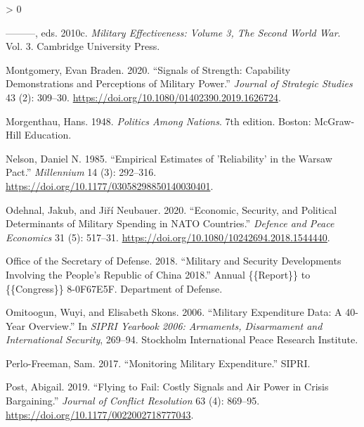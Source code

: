 \documentclass[
]{article}
\newlength{\cslhangindent}
\newenvironment{CSLReferences}[2] %
 {%
  \setlength{\parindent}{0pt}
  \ifodd #1 \everypar{\setlength{\hangindent}{\cslhangindent}}\ignorespaces\fi
  \ifnum #2 > 0
  \setlength{\parskip}{#2\baselineskip}
  \fi
 }%
 {}
\begin{document}
\begin{CSLReferences}{1}{0}
\leavevmode\hypertarget{ref-millett_militaryeffectivenessvolume_2010b}{}%
---------, eds. 2010c. \emph{Military {Effectiveness}: {Volume} 3, {The Second World War}}. Vol. 3. {Cambridge University Press}.

\leavevmode\hypertarget{ref-montgomery_signalsstrengthcapability_2020}{}%
Montgomery, Evan Braden. 2020. {``Signals of Strength: {Capability} Demonstrations and Perceptions of Military Power.''} \emph{Journal of Strategic Studies} 43 (2): 309--30. \url{https://doi.org/10.1080/01402390.2019.1626724}.

\leavevmode\hypertarget{ref-morgenthau_politicsnations_1948}{}%
Morgenthau, Hans. 1948. \emph{Politics {Among Nations}}. 7th edition. {Boston}: {McGraw-Hill Education}.

\leavevmode\hypertarget{ref-nelson_empiricalestimatesreliability_1985}{}%
Nelson, Daniel N. 1985. {``Empirical {Estimates} of '{Reliability}' in the {Warsaw Pact}.''} \emph{Millennium} 14 (3): 292--316. \url{https://doi.org/10.1177/03058298850140030401}.

\leavevmode\hypertarget{ref-odehnal_economicsecuritypolitical_2020}{}%
Odehnal, Jakub, and Jiří Neubauer. 2020. {``Economic, {Security}, and {Political Determinants} of {Military Spending} in {NATO Countries}.''} \emph{Defence and Peace Economics} 31 (5): 517--31. \url{https://doi.org/10.1080/10242694.2018.1544440}.

\leavevmode\hypertarget{ref-officeofthesecretaryofdefense_militarysecuritydevelopments_2018}{}%
Office of the Secretary of Defense. 2018. {``Military and {Security Developments Involving} the {People}'s {Republic} of {China} 2018.''} Annual \{\{Report\}\} to \{\{Congress\}\} 8-0F67E5F. {Department of Defense}.

\leavevmode\hypertarget{ref-omitoogun_militaryexpendituredata_2006}{}%
Omitoogun, Wuyi, and Elisabeth Skons. 2006. {``Military Expenditure Data: A 40-Year Overview.''} In \emph{{SIPRI Yearbook} 2006: {Armaments}, {Disarmament} and {International Security}}, 269--94. {Stockholm International Peace Research Institute}.

\leavevmode\hypertarget{ref-perlo-freeman_monitoringmilitaryexpenditure_2017}{}%
Perlo-Freeman, Sam. 2017. {``Monitoring Military Expenditure.''} {SIPRI}.

\leavevmode\hypertarget{ref-post_flyingfailcostly_2019}{}%
Post, Abigail. 2019. {``Flying to {Fail}: {Costly Signals} and {Air Power} in {Crisis Bargaining}.''} \emph{Journal of Conflict Resolution} 63 (4): 869--95. \url{https://doi.org/10.1177/0022002718777043}.


\end{CSLReferences}
\end{document}
